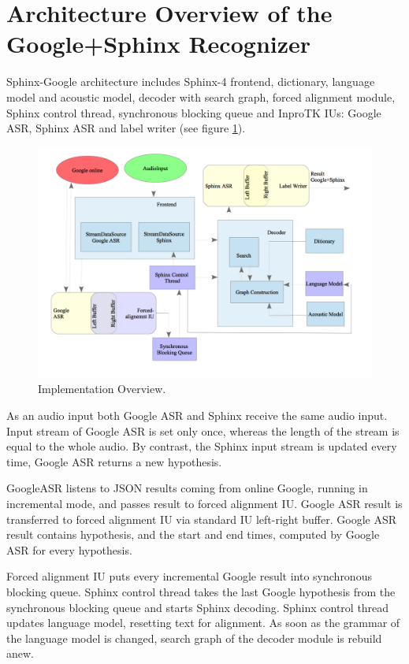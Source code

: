 \section {Architecture Overview of the Google+Sphinx Recognizer}
Sphinx-Google architecture includes Sphinx-4 frontend, dictionary,
language model and acoustic model, decoder with search graph, forced alignment
module, Sphinx control thread, synchronous blocking queue and InproTK IUs:
Google ASR, Sphinx ASR and label writer (see figure \ref {fig:arch}).
\begin{figure}[htbp]
  \centering
    \includegraphics[width=1\textwidth]{images/architecture.png}
 \caption{Implementation Overview.}
  \label{fig:arch}
\end {figure} 

As an audio input both Google ASR and Sphinx receive the same audio input.
Input stream of Google ASR is set only once, whereas the length of
the stream is equal to the whole audio. By contrast, the Sphinx input stream is
updated every time, Google ASR returns a new hypothesis.  


GoogleASR listens to JSON results coming from online Google, running
in incremental mode, and passes result to forced alignment IU. Google ASR result
is transferred to forced alignment IU via standard IU left-right buffer. Google
ASR result contains hypothesis, and the start and end times, computed by Google
ASR for every hypothesis. 

Forced alignment IU puts every incremental Google result into synchronous
blocking queue. Sphinx control thread takes the last Google hypothesis from the
synchronous blocking queue and starts Sphinx decoding. Sphinx control thread
updates language model, resetting text for alignment. As soon as the grammar of
the language model is changed, search graph of the decoder module is rebuild
anew. 


